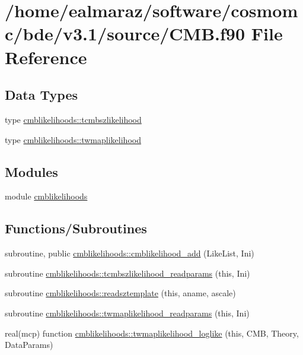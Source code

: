 \hypertarget{CMB_8f90}{}\section{/home/ealmaraz/software/cosmomc/bde/v3.1/source/\+C\+MB.f90 File Reference}
\label{CMB_8f90}
\subsection*{Data Types}
\begin{DoxyCompactItemize}
\item 
type \mbox{\hyperlink{structcmblikelihoods_1_1tcmbszlikelihood}{cmblikelihoods\+::tcmbszlikelihood}}
\item 
type \mbox{\hyperlink{structcmblikelihoods_1_1twmaplikelihood}{cmblikelihoods\+::twmaplikelihood}}
\end{DoxyCompactItemize}
\subsection*{Modules}
\begin{DoxyCompactItemize}
\item 
module \mbox{\hyperlink{namespacecmblikelihoods}{cmblikelihoods}}
\end{DoxyCompactItemize}
\subsection*{Functions/\+Subroutines}
\begin{DoxyCompactItemize}
\item 
subroutine, public \mbox{\hyperlink{namespacecmblikelihoods_a6b235ad1e7fa8ebc5304542f01584617}{cmblikelihoods\+::cmblikelihood\+\_\+add}} (Like\+List, Ini)
\item 
subroutine \mbox{\hyperlink{namespacecmblikelihoods_ae775cfc1ab138a93684346c644269110}{cmblikelihoods\+::tcmbszlikelihood\+\_\+readparams}} (this, Ini)
\item 
subroutine \mbox{\hyperlink{namespacecmblikelihoods_ac2d0805940347a1cc9fc6d7ef007e082}{cmblikelihoods\+::readsztemplate}} (this, aname, ascale)
\item 
subroutine \mbox{\hyperlink{namespacecmblikelihoods_a38cdfcee85309289ed17ecc5b60d5ff7}{cmblikelihoods\+::twmaplikelihood\+\_\+readparams}} (this, Ini)
\item 
real(mcp) function \mbox{\hyperlink{namespacecmblikelihoods_a7c01807a08609a029a41a11b39ade069}{cmblikelihoods\+::twmaplikelihood\+\_\+loglike}} (this, C\+MB, Theory, Data\+Params)
\end{DoxyCompactItemize}
